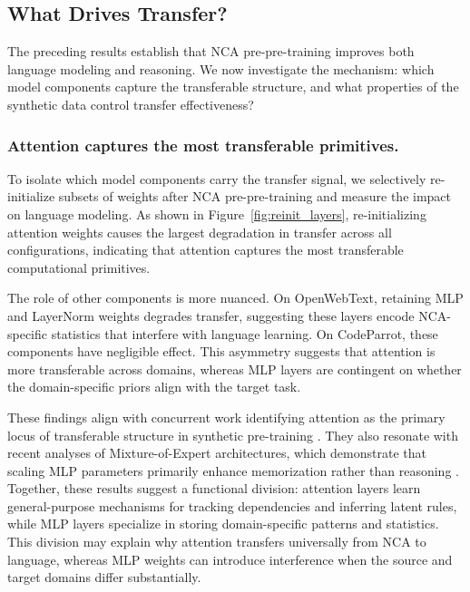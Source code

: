 \documentclass{article}
\theoremstyle{plain}
\theoremstyle{definition}
\theoremstyle{remark}
\begin{document}
\subsection{What Drives Transfer?}
\label{subsec:what_drives}

The preceding results establish that NCA pre-pre-training improves both language modeling and reasoning. We now investigate the mechanism: which model components capture the transferable structure, and what properties of the synthetic data control transfer effectiveness?

\subsubsection{Attention captures the most transferable primitives.}
\label{subsubsec:attn_transfer}
To isolate which model components carry the transfer signal, we selectively re-initialize subsets of weights after NCA pre-pre-training and measure the impact on language modeling. As shown in Figure~\ref{fig:reinit_layers}, re-initializing attention weights causes the largest degradation in transfer across all configurations, indicating that attention captures the most transferable computational primitives.

The role of other components is more nuanced. On OpenWebText, retaining MLP and LayerNorm weights degrades transfer, suggesting these layers encode NCA-specific statistics that interfere with language learning. On CodeParrot, these components have negligible effect. This asymmetry suggests that attention is more transferable across domains, whereas MLP layers are contingent on whether the domain-specific priors align with the target task.

These findings align with concurrent work identifying attention as the primary locus of transferable structure in synthetic pre-training \citep{shinnick2025transformers, shinnick2025learnimagesproceduralwarmup}. They also resonate with recent analyses of Mixture-of-Expert architectures, which demonstrate that scaling MLP parameters primarily enhance memorization rather than reasoning \citep{jelassi2025mixtureparrotsexpertsimprove}. Together, these results suggest a functional division: attention layers learn general-purpose mechanisms for tracking dependencies and inferring latent rules, while MLP layers specialize in storing domain-specific patterns and statistics. This division may explain why attention transfers universally from NCA to language, whereas MLP weights can introduce interference when the source and target domains differ substantially.
\end{document}
